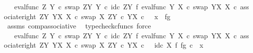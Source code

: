 \begin{isabellebody}
\ {\isachardoublequoteopen}{\isachardot}{\kern0pt}{\isachardot}{\kern0pt}{\isachardot}{\kern0pt}\ {\isacharequal}{\kern0pt}\ {\isacharparenleft}{\kern0pt}eval{\isacharunderscore}{\kern0pt}func\ Z\ Y\ {\isasymcirc}\isactrlsub c\ swap\ {\isacharparenleft}{\kern0pt}Z\isactrlbsup Y\isactrlesup {\isacharparenright}{\kern0pt}\ Y\ {\isasymcirc}\isactrlsub c\ {\isacharparenleft}{\kern0pt}id\isactrlsub c\ {\isacharparenleft}{\kern0pt}Z\isactrlbsup Y\isactrlesup {\isacharparenright}{\kern0pt}\ {\isasymtimes}\isactrlsub f\ eval{\isacharunderscore}{\kern0pt}func\ Y\ X\ {\isasymcirc}\isactrlsub c\ swap\ {\isacharparenleft}{\kern0pt}Y\isactrlbsup X\isactrlesup {\isacharparenright}{\kern0pt}\ X{\isacharparenright}{\kern0pt}\ {\isasymcirc}\isactrlsub c\ associate{\isacharunderscore}{\kern0pt}right\ {\isacharparenleft}{\kern0pt}Z\isactrlbsup Y\isactrlesup {\isacharparenright}{\kern0pt}\ {\isacharparenleft}{\kern0pt}Y\isactrlbsup X\isactrlesup {\isacharparenright}{\kern0pt}\ X\ {\isasymcirc}\isactrlsub c\ swap\ X\ {\isacharparenleft}{\kern0pt}Z\isactrlbsup Y\isactrlesup \ {\isasymtimes}\isactrlsub c\ Y\isactrlbsup X\isactrlesup {\isacharparenright}{\kern0pt}{\isacharparenright}{\kern0pt}\ {\isasymcirc}\isactrlsub c\ \ \ {\isasymlangle}x{\isacharcomma}{\kern0pt}\ \ {\isasymlangle}f{\isacharcomma}{\kern0pt}g{\isasymrangle}{\isasymrangle}{\isachardoublequoteclose}\isanewline
\ \ \ \ \ \ \isamarkupfalse%
\ assms\ comp{\isacharunderscore}{\kern0pt}associative{}\ \isamarkupfalse%
\ {\isacharparenleft}{\kern0pt}typecheck{\isacharunderscore}{\kern0pt}cfuncs{\isacharcomma}{\kern0pt}\ force{\isacharparenright}{\kern0pt}\isanewline
\ \ \ \ \isamarkupfalse%
\ \isamarkupfalse%
\ {\isachardoublequoteopen}{\isachardot}{\kern0pt}{\isachardot}{\kern0pt}{\isachardot}{\kern0pt}\ {\isacharequal}{\kern0pt}\ {\isacharparenleft}{\kern0pt}eval{\isacharunderscore}{\kern0pt}func\ Z\ Y\ {\isasymcirc}\isactrlsub c\ swap\ {\isacharparenleft}{\kern0pt}Z\isactrlbsup Y\isactrlesup {\isacharparenright}{\kern0pt}\ Y\ {\isasymcirc}\isactrlsub c\ {\isacharparenleft}{\kern0pt}id\isactrlsub c\ {\isacharparenleft}{\kern0pt}Z\isactrlbsup Y\isactrlesup {\isacharparenright}{\kern0pt}\ {\isasymtimes}\isactrlsub f\ eval{\isacharunderscore}{\kern0pt}func\ Y\ X\ {\isasymcirc}\isactrlsub c\ swap\ {\isacharparenleft}{\kern0pt}Y\isactrlbsup X\isactrlesup {\isacharparenright}{\kern0pt}\ X{\isacharparenright}{\kern0pt}\ {\isasymcirc}\isactrlsub c\ associate{\isacharunderscore}{\kern0pt}right\ {\isacharparenleft}{\kern0pt}Z\isactrlbsup Y\isactrlesup {\isacharparenright}{\kern0pt}\ {\isacharparenleft}{\kern0pt}Y\isactrlbsup X\isactrlesup {\isacharparenright}{\kern0pt}\ X\ {\isasymcirc}\isactrlsub c\ swap\ X\ {\isacharparenleft}{\kern0pt}Z\isactrlbsup Y\isactrlesup \ {\isasymtimes}\isactrlsub c\ Y\isactrlbsup X\isactrlesup {\isacharparenright}{\kern0pt}{\isacharparenright}{\kern0pt}\ {\isasymcirc}\isactrlsub c\ \ \ {\isacharparenleft}{\kern0pt}{\isacharparenleft}{\kern0pt}id\isactrlsub c\ X\ {\isasymtimes}\isactrlsub f\ {\isasymlangle}f{\isacharcomma}{\kern0pt}g{\isasymrangle}{\isacharparenright}{\kern0pt}\ {\isasymcirc}\isactrlsub c\ \ x{}{\isacharparenright}{\kern0pt}{\isachardoublequoteclose}\isanewline

\end{isabellebody}

